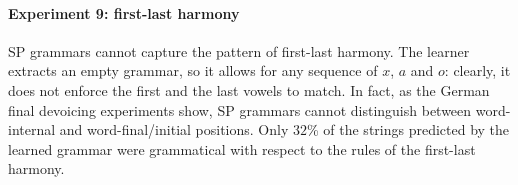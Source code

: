\begin{table}[h!]
\centering
{}
\caption{SP learning of vowel and consonant harmonies with blockers; abstract representation.}
\end{table}


\paragraph{Experiment 9: first-last harmony}

SP grammars cannot capture the pattern of first-last harmony.
The learner extracts an empty grammar, so it allows for any sequence of $x$, $a$ and $o$: clearly, it does not enforce the first and the last vowels to match.
In fact, as the German final devoicing experiments show, SP grammars cannot distinguish between word-internal and word-final/initial positions. 
Only $32$\% of the strings predicted by the learned grammar were grammatical with respect to the rules of the first-last harmony.

\begin{table}[h!]
\centering
{}
\caption{SP learning of first-last harmony; abstract representation.}
\end{table}


